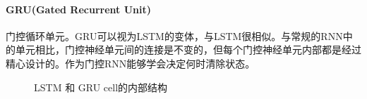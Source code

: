\paragraph{GRU(Gated Recurrent Unit)} 门控循环单元。GRU可以视为LSTM的变体，与LSTM很相似。与常规的RNN中的单元相比，门控神经单元间的连接是不变的，但每个门控神经单元内部都是经过精心设计的。作为门控RNN能够学会决定何时清除状态。
\begin{figure}[h]
    \centering
    \hspace{1.5pt}
    \caption{LSTM 和 GRU cell的内部结构}
    \label{fig:cell}
\end{figure}

